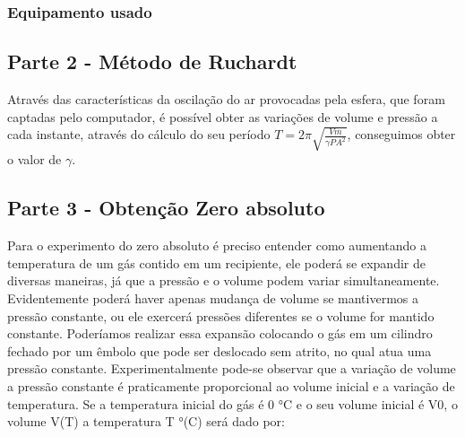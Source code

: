\documentclass[a4paper]{ltxdoc}
\numberwithin{equation}{section}
\begin{document}
\subsubsection{Equipamento usado}

\begin{tcolorbox}[colback=white, colframe=red!40!black, title=\textbf{Garrafão de vidro}]

\end{tcolorbox}


\subsection{Parte 2 - Método de Ruchardt}

Através das características da oscilação do ar provocadas pela esfera, que foram captadas pelo computador, é possível obter as variações de volume e pressão a cada instante, através do cálculo do seu período $T = 2\pi \sqrt{ \frac{Vm}{\gamma PA^2} }$, conseguimos obter o valor de $\gamma$.

\subsection{Parte 3 - Obtenção Zero absoluto}

Para o experimento do zero absoluto é preciso entender como aumentando a temperatura de um gás contido em um recipiente, ele poderá se expandir de diversas maneiras, já que a pressão e o volume podem variar simultaneamente. Evidentemente poderá haver apenas mudança de volume se mantivermos a pressão constante, ou ele exercerá pressões diferentes se o volume for mantido constante. Poderíamos realizar essa expansão colocando o gás em um cilindro fechado por um êmbolo que pode ser deslocado sem atrito, no qual atua uma pressão constante. Experimentalmente pode-se observar que a variação de volume a pressão constante é praticamente proporcional ao volume inicial e a variação de temperatura. Se a temperatura inicial do gás é 0 °C e o seu volume inicial é V0, o volume V(T) a temperatura T °(C) será dado por: 
\end{document}
